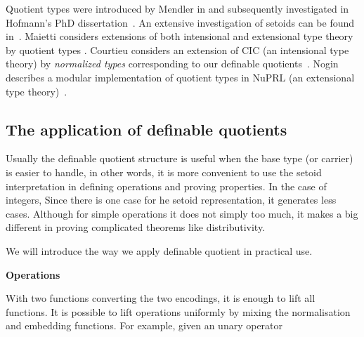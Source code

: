 Quotient types were introduced by Mendler in
\cite{men:90} and subsequently investigated in Hofmann's
PhD dissertation~\cite{hof:phd}. An extensive investigation of setoids
can be found in~\cite{bar:03}. Maietti considers extensions
of both intensional and extensional type theory by quotient types
\cite{maietti1999effective}. Courtieu considers an extension of CIC
(an intensional type theory) by \emph{normalized types} corresponding
to our definable quotients~\cite{cou:01}. Nogin describes a
modular implementation of quotient types in NuPRL (an extensional type
theory)~\cite{nog:02}.



















\subsection{The application of definable quotients}

Usually the definable quotient structure is useful when the base type (or carrier) is easier to handle, in other
words, it is more convenient to use the setoid interpretation in
defining operations and proving properties.
In the case of integers, Since there is one case for he setoid
representation, it generates less cases. Although for simple
operations it does not simply too much, it makes a big different in
proving complicated theorems like distributivity.

We will introduce the way we apply definable quotient in practical use.

{\textbf{\large{Operations}}}

With two functions converting the two encodings, it is enough to lift
all functions. It is possible to lift operations uniformly by mixing the
normalisation and embedding functions. For example, given an unary
operator 

\begin{code}
\\
\> \AgdaSymbol{:} \AgdaSymbol{(} \AgdaSymbol{:}   \AgdaSymbol{)}    \<%
\\
\>  \AgdaSymbol{=} \AgdaFunction{[\_]}    \<%
\\
\end{code}

